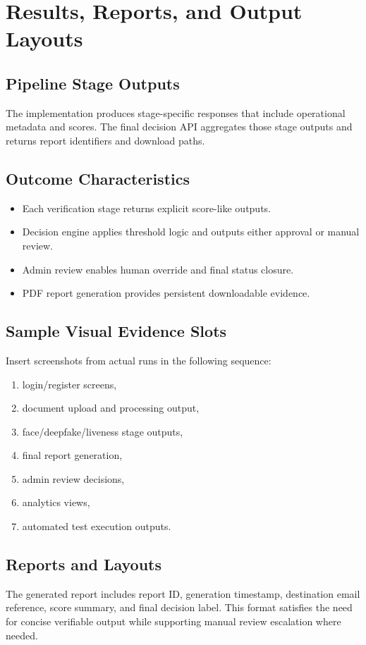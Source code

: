 \chapter{Results, Reports, and Output Layouts}

\section{Pipeline Stage Outputs}
The implementation produces stage-specific responses that include operational metadata and scores. The final decision API aggregates those stage outputs and returns report identifiers and download paths.

\section{Outcome Characteristics}
\begin{itemize}
\item Each verification stage returns explicit score-like outputs.
\item Decision engine applies threshold logic and outputs either approval or manual review.
\item Admin review enables human override and final status closure.
\item PDF report generation provides persistent downloadable evidence.
\end{itemize}

\section{Sample Visual Evidence Slots}
Insert screenshots from actual runs in the following sequence:
\begin{enumerate}
\item login/register screens,
\item document upload and processing output,
\item face/deepfake/liveness stage outputs,
\item final report generation,
\item admin review decisions,
\item analytics views,
\item automated test execution outputs.
\end{enumerate}

\section{Reports and Layouts}
The generated report includes report ID, generation timestamp, destination email reference, score summary, and final decision label. This format satisfies the need for concise verifiable output while supporting manual review escalation where needed.

